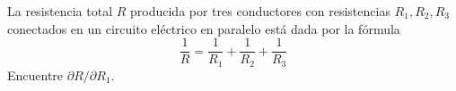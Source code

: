 \item La resistencia total $R$ producida por tres conductores con resistencias $R_1, R_2, R_3$ conectados en un circuito eléctrico en paralelo está dada por la fórmula
\[ \frac{1}{R} = \frac{1}{R_1} + \frac{1}{R_2} + \frac{1}{R_3} \]
Encuentre $\partial R / \partial R_1$.
